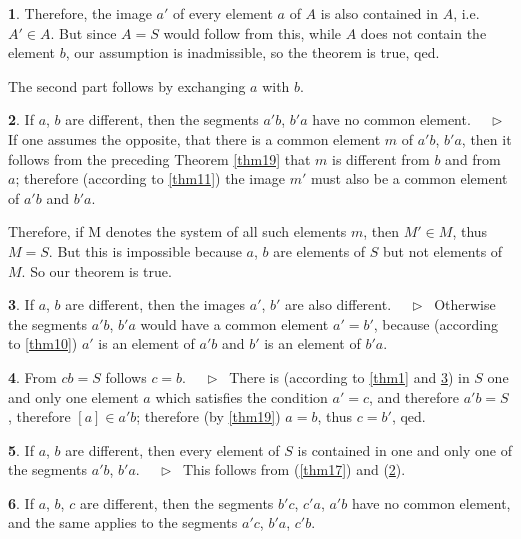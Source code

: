 \documentclass[leqno,hidelinks,a4paper]{article}
\theoremstyle{definition}
\newtheorem{satz}{\protect\satzname}
\newcommand{\satzname}{}
\renewcommand{\satzname}{\hspace{-4pt}.\ Satz}%
\renewcommand{\satzname}{\hspace{-4pt}.\ Theorem}%
\newcommand\Beweis{\medskip \newline $ \phantom{'.'} \rhd \ $}%
\newcommand{\partof}{\in}
\begin{document}
\begin{paracol}{2}
\begin{satz}
Therefore, the image $a'$ of every element $a$ of $A$ is also contained in $A$,
i.e. $A' \partof A$. But since $A=S$ would follow from this, while $A$ does not
contain the element $b$, our assumption is inadmissible, so the theorem is true,
qed.

The second part follows by exchanging $a$ with $b$.%
\end{satz}

\begin{satz}\label{thm20}
If $a$, $b$ are different, then the segments $a'b$, $b'a$ have no common element.
\Beweis
If one assumes the opposite, that there is a common element $m$ of $a'b$, $b'a$,
then it follows from the preceding Theorem \ref{thm19} that $m$ is different from
$b$ and from $a$; therefore (according to \ref{thm11}) the image $m'$ must also be
a common element of $a'b$ and $b'a$.%

Therefore, if M denotes the system of all such elements $m$, then $M' \partof M$,
thus $M=S$. But this is impossible because $a$, $b$ are elements of $S$ but not
elements of $M$. So our theorem is true.%
\ \\
\end{satz}

\begin{satz}\label{thm21}
If $a$, $b$ are different, then the images $a'$, $b'$ are also different.
\Beweis
Otherwise the segments $a'b$, $b'a$ would have a common element $a'=b'$, because
(according to \ref{thm10}) $a'$ is an element of $a'b$ and $b'$ is an element
of $b'a$.%
\end{satz}

\begin{satz}\label{thm22}
From $cb=S$ follows $c = b$.
\Beweis
There is (according to \ref{thm1} and \ref{thm21}) in $S$ one and only one element
$a$ which satisfies the condition $a'=c$, and therefore $a'b = S$, therefore
$[a] \partof a'b$; therefore (by \ref{thm19}) $a=b$, thus $c=b'$, qed.%
\end{satz}

\begin{satz}\label{thm23}
If $a$, $b$ are different, then every element of $S$ is contained in one and only
one of the segments $a'b$, $b'a$.
\Beweis
This follows from (\ref{thm17}) and (\ref{thm20}).
\end{satz}

\begin{satz}\label{thm24}
If $a$, $b$, $c$ are different, then the segments $b'c$, $c'a$, $a'b$ have no
common element, and the same applies to the segments $a'c$, $b'a$, $c'b$.
\ \\


\end{satz}
\end{paracol}
\end{document}
